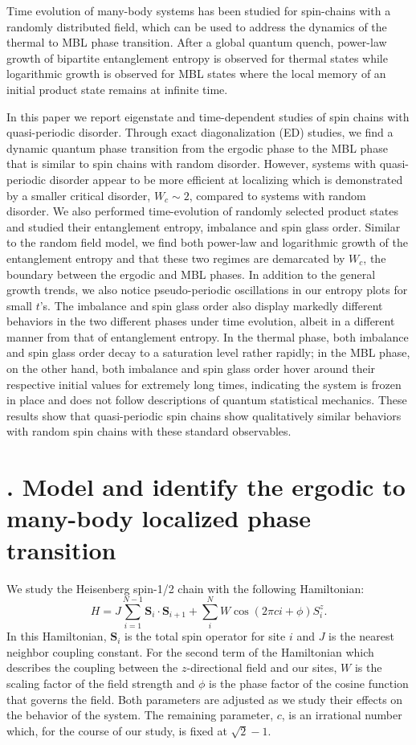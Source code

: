 \documentclass[prl,aps,epsf,showpacs,twocolumn,letterpaper]{revtex4}
\let\oldsection\section
\renewcommand{\section}[1]{\stepcounter{section}\oldsection{\Roman{section}. #1}}
\begin{document}
Time evolution of many-body systems has been studied for spin-chains with a 
randomly distributed field\cite{kjall2014,luitz2016time}, which can be used to 
address the dynamics of the thermal to MBL phase 
transition\cite{nandkishore2015,vosk_theory2014,potter2015}.  After a global 
quantum quench, power-law growth of bipartite entanglement entropy is observed 
for thermal states while logarithmic growth is observed for MBL states where 
the local memory of an initial product state remains at infinite 
time\cite{luitz2016time}.


In this paper we report eigenstate and time-dependent studies of spin chains 
with quasi-periodic disorder.  Through exact diagonalization (ED) studies, we 
find a dynamic quantum phase transition from the ergodic phase to the MBL phase 
that is similar to spin chains with random disorder.  However, systems with 
quasi-periodic disorder appear to be more efficient at localizing which is 
demonstrated by a smaller critical disorder, $W_c \sim 2$, compared to systems 
with random disorder.  We also performed time-evolution of randomly selected 
product states and studied their entanglement entropy, imbalance and spin glass 
order. Similar to the random field model, we find both power-law and 
logarithmic growth of the entanglement entropy and that these two regimes are 
demarcated by $W_c$, the boundary between the ergodic and MBL phases.  In 
addition to the general growth trends, we also notice pseudo-periodic 
oscillations in our entropy plots for small $t$'s. The imbalance and spin glass 
order also display markedly different behaviors in the two different phases 
under time evolution, albeit in a different manner from that of entanglement 
entropy. In the thermal phase, both imbalance and spin glass order decay to a 
saturation level rather rapidly; in the MBL phase, on the other hand, both 
imbalance and spin glass order hover around their respective initial values for 
extremely long times, indicating the system is frozen in place and does not 
follow descriptions of quantum statistical mechanics. These results show that 
quasi-periodic spin chains show qualitatively similar behaviors with random 
spin chains with these standard observables.


\section{Model and identify the ergodic to many-body localized phase transition}


We study the Heisenberg spin-1/2 chain with the following Hamiltonian:
\[
  H = J\sum_{i=1}^{N-1} \mathbf{S}_i \cdot \mathbf{S}_{i+1}
  + \sum_{i}^{N} W\cos(2\pi c i+\phi) S_i^z \text{.}
\]
In this Hamiltonian, $\mathbf{S}_i$ is the total spin operator for site $i$ and
$J$ is the nearest neighbor coupling constant.
For the second term of the Hamiltonian which describes the coupling between the
$z$-directional field and our sites, $W$ is the scaling factor of the field
strength and $\phi$ is the phase factor of the cosine function that governs the
field.
Both parameters are adjusted as we study their effects on the behavior of the
system.
The remaining parameter, $c$, is an irrational number which, for the course of
our study, is fixed at $\sqrt{2} - 1$.
\end{document}
